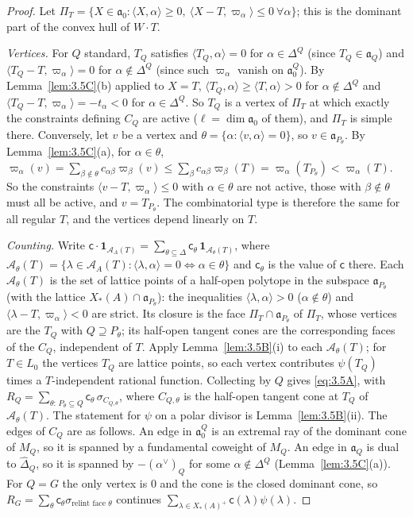 \documentclass[12pt,letterpaper]{article}
\numberwithin{equation}{section}
\theoremstyle{plain}
\theoremstyle{remark}
\theoremstyle{plain}
\theoremstyle{definition}
\theoremstyle{remark}
\theoremstyle{remark}
\newcommand{\cA}{\mathcal{A}}
\newcommand{\fa}{\mathfrak{a}}
\newcommand{\ip}[1]{\langle #1\rangle}
\newcommand{\one}{\mathbf 1}
\begin{document}
\begin{proof}
Let $\Pi_T=\{X\in\fa_0:\ip{X,\alpha}\ge0,\ \ip{X-T,\varpi_\alpha}\le0\ \forall\alpha\}$; this is the dominant part of the convex hull of $W\cdot T$.

\emph{Vertices.} For $Q$ standard, $T_Q$ satisfies $\ip{T_Q,\alpha}=0$ for $\alpha\in\Delta^Q$ (since $T_Q\in\fa_Q$) and $\ip{T_Q-T,\varpi_\alpha}=0$ for $\alpha\notin\Delta^Q$ (since such $\varpi_\alpha$ vanish on $\fa_0^Q$). By Lemma~\ref{lem:3.5C}(b) applied to $X=T$, $\ip{T_Q,\alpha}\ge\ip{T,\alpha}>0$ for $\alpha\notin\Delta^Q$ and $\ip{T_Q-T,\varpi_\alpha}=-t_\alpha<0$ for $\alpha\in\Delta^Q$. So $T_Q$ is a vertex of $\Pi_T$ at which exactly the constraints defining $C_Q$ are active ($\ell=\dim\fa_0$ of them), and $\Pi_T$ is simple there. Conversely, let $v$ be a vertex and $\theta=\{\alpha:\ip{v,\alpha}=0\}$, so $v\in\fa_{P_\theta}$. By Lemma~\ref{lem:3.5C}(a), for $\alpha\in\theta$, $\varpi_\alpha(v)=\sum_{\beta\notin\theta}c_{\alpha\beta}\varpi_\beta(v)\le\sum_\beta c_{\alpha\beta}\varpi_\beta(T)=\varpi_\alpha(T_{P_\theta})<\varpi_\alpha(T)$. So the constraints $\ip{v-T,\varpi_\alpha}\le0$ with $\alpha\in\theta$ are not active, those with $\beta\notin\theta$ must all be active, and $v=T_{P_\theta}$. The combinatorial type is therefore the same for all regular $T$, and the vertices depend linearly on $T$.

\emph{Counting.} Write $\mathsf c\cdot\one_{\cA_A(T)}=\sum_{\theta\subseteq\Delta}\mathsf c_\theta\,\one_{\cA_\theta(T)}$, where $\cA_\theta(T)=\{\lambda\in\cA_A(T):\ip{\lambda,\alpha}=0\iff\alpha\in\theta\}$ and $\mathsf c_\theta$ is the value of $\mathsf c$ there. Each $\cA_\theta(T)$ is the set of lattice points of a half-open polytope in the subspace $\fa_{P_\theta}$ (with the lattice $X_*(A)\cap\fa_{P_\theta}$): the inequalities $\ip{\lambda,\alpha}>0$ ($\alpha\notin\theta$) and $\ip{\lambda-T,\varpi_\alpha}<0$ are strict. Its closure is the face $\Pi_T\cap\fa_{P_\theta}$ of $\Pi_T$, whose vertices are the $T_Q$ with $Q\supseteq P_\theta$; its half-open tangent cones are the corresponding faces of the $C_Q$, independent of $T$. Apply Lemma~\ref{lem:3.5B}(i) to each $\cA_\theta(T)$; for $T\in L_0$ the vertices $T_Q$ are lattice points, so each vertex contributes $\psi(T_Q)$ times a $T$-independent rational function. Collecting by $Q$ gives \eqref{eq:3.5A}, with $R_Q=\sum_{\theta:\,P_\theta\subseteq Q}\mathsf c_\theta\,\sigma_{C_{Q,\theta}}$, where $C_{Q,\theta}$ is the half-open tangent cone at $T_Q$ of $\cA_\theta(T)$. The statement for $\psi$ on a polar divisor is Lemma~\ref{lem:3.5B}(ii). The edges of $C_Q$ are as follows. An edge in $\fa_0^Q$ is an extremal ray of the dominant cone of $M_Q$, so it is spanned by a fundamental coweight of $M_Q$. An edge in $\fa_Q$ is dual to $\hat\Delta_Q$, so it is spanned by $-(\alpha^\vee)_Q$ for some $\alpha\notin\Delta^Q$ (Lemma~\ref{lem:3.5C}(a)). For $Q=G$ the only vertex is $0$ and the cone is the closed dominant cone, so $R_G=\sum_\theta\mathsf c_\theta\sigma_{\text{relint face }\theta}$ continues $\sum_{\lambda\in X_*(A)^+}\mathsf c(\lambda)\psi(\lambda)$.
\end{proof}
\end{document}

